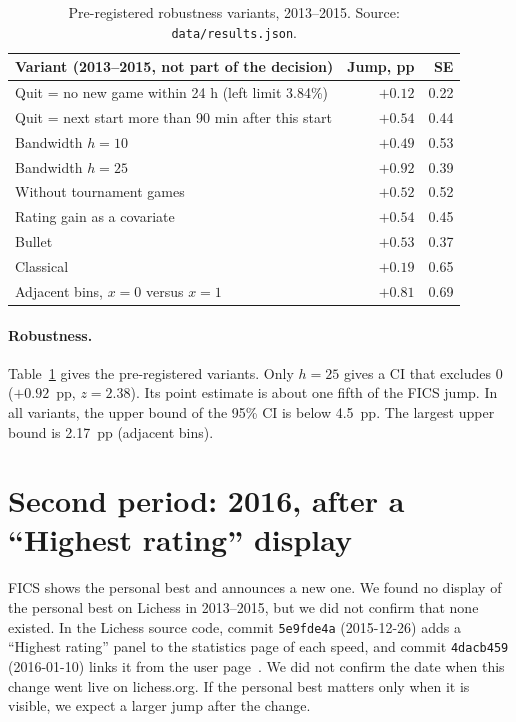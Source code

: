 \documentclass[11pt]{article}
\begin{document}
\begin{table}[h]
\centering
\small
\begin{tabular}{lrr}
\toprule
Variant (2013--2015, not part of the decision) & Jump, pp & SE \\
\midrule
Quit = no new game within 24 h (left limit 3.84\%) & $+0.12$ & 0.22 \\
Quit = next start more than 90 min after this start & $+0.54$ & 0.44 \\
Bandwidth $h = 10$ & $+0.49$ & 0.53 \\
Bandwidth $h = 25$ & $+0.92$ & 0.39 \\
Without tournament games & $+0.52$ & 0.52 \\
Rating gain as a covariate & $+0.54$ & 0.45 \\
Bullet & $+0.53$ & 0.37 \\
Classical & $+0.19$ & 0.65 \\
Adjacent bins, $x=0$ versus $x=1$ & $+0.81$ & 0.69 \\
\bottomrule
\end{tabular}
\caption{Pre-registered robustness variants, 2013--2015. Source: \texttt{data/results.json}.}
\label{tab:rob}
\end{table}

\paragraph{Robustness.} Table~\ref{tab:rob} gives the pre-registered variants. Only $h=25$ gives a CI that excludes 0 ($+0.92$~pp, $z=2.38$). Its point estimate is about one fifth of the FICS jump. In all variants, the upper bound of the 95\% CI is below 4.5~pp. The largest upper bound is 2.17~pp (adjacent bins).

\section{Second period: 2016, after a ``Highest rating'' display}\label{sec:2016}

FICS shows the personal best and announces a new one. We found no display of the personal best on Lichess in 2013--2015, but we did not confirm that none existed. In the Lichess source code, commit \texttt{5e9fde4a} (2015-12-26) adds a ``Highest rating'' panel to the statistics page of each speed, and commit \texttt{4dacb459} (2016-01-10) links it from the user page~\cite{lila}. We did not confirm the date when this change went live on lichess.org. If the personal best matters only when it is visible, we expect a larger jump after the change.
\end{document}
